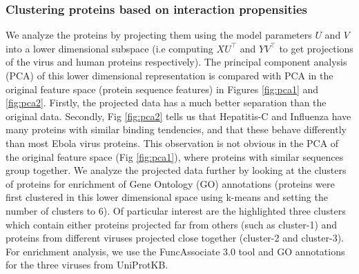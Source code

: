 \documentclass{bioinfo}
\begin{document}
\subsubsection{Clustering proteins based on interaction propensities}
We analyze the proteins by projecting them using the model parameters $U$ and $V$ into a lower dimensional subspace 
(i.e computing $X U^\intercal$ and $Y V^\intercal$ to get projections of the virus and human proteins respectively).  
The principal component analysis (PCA) of this lower dimensional representation is compared with PCA in the original feature space (protein sequence features) in Figures \ref{fig:pca1} and \ref{fig:pca2}. 
Firstly, the projected data has a much better separation than the original data.
Secondly, Fig \ref{fig:pca2} tells us that Hepatitis-C and Influenza have many proteins with similar binding tendencies, and that these behave differently than most Ebola virus proteins. This observation is not obvious in the PCA of the original feature space (Fig \ref{fig:pca1}), where proteins with similar sequences group together.
We analyze the projected data further by looking at the clusters of proteins for enrichment of Gene Ontology (GO) annotations (proteins were first clustered in this lower dimensional space using k-means and setting the number of clusters to 6). Of particular interest are the highlighted three clusters which contain either proteins projected far from others (such as cluster-1) and proteins from different viruses projected close together (cluster-2 and cluster-3).
For enrichment analysis, we use the FuncAssociate 3.0 \citep{funcAsso} tool and GO annotations for the three viruses from UniProtKB.


\end{document}
